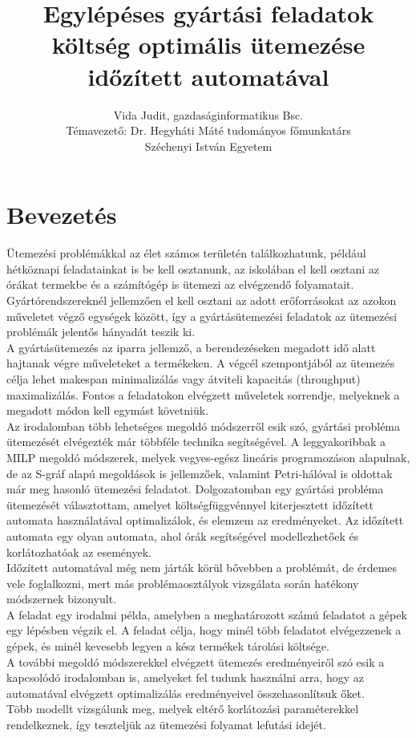 \documentclass {report}
\begin{document}
\title{Egylépéses gyártási feladatok költség optimális ütemezése időzített automatával}

\author{Vida Judit, gazdaságinformatikus Bsc.\\Témavezető: Dr. Hegyháti Máté tudományos főmunkatárs\\Széchenyi István Egyetem}
\maketitle


\tableofcontents
\chapter{Bevezetés}
Ütemezési problémákkal az élet számos területén találkozhatunk, például hétköznapi feladatainkat is be kell osztanunk, az iskolában el kell osztani az órákat termekbe és a számítógép is ütemezi az elvégzendő folyamatait. Gyártórendszereknél jellemzően el kell osztani az adott erőforrásokat az azokon műveletet végző egységek között, így a gyártásütemezési feladatok az ütemezési problémák jelentős hányadát teszik ki. \\
A gyártásütemezés az iparra jellemző, a berendezéseken megadott idő alatt hajtanak végre műveleteket a termékeken. A végcél szempontjából az ütemezés célja lehet makespan minimalizálás vagy átviteli kapacitás (throughput) maximalizálás. Fontos a feladatokon elvégzett műveletek sorrendje, melyeknek a megadott módon kell egymást követniük.\\
Az irodalomban több lehetséges megoldó módszerről esik szó, gyártási probléma ütemezését elvégezték már többféle technika segítségével. A leggyakoribbak a MILP megoldó módszerek, melyek vegyes-egész lineáris programozáson alapulnak, de az S-gráf alapú megoldások is jellemzőek, valamint Petri-hálóval is oldottak már meg hasonló ütemezési feladatot.
Dolgozatomban egy gyártási probléma ütemezését választottam, amelyet költségfüggvénnyel kiterjesztett időzített automata használatával optimalizálok, és elemzem az eredményeket. Az időzített automata egy olyan automata, ahol órák segítségével modellezhetőek és korlátozhatóak az események.\\
Időzített automatával még nem járták körül bővebben a problémát, de érdemes vele foglalkozni, mert más problémaosztályok vizsgálata során hatékony módszernek bizonyult.\\
A feladat egy irodalmi példa, amelyben a meghatározott számú feladatot a gépek egy lépésben végzik el.
A feladat célja, hogy minél több feladatot elvégezzenek a gépek, és minél kevesebb legyen a kész termékek tárolási költsége.\\
A további megoldó módszerekkel elvégzett ütemezés eredményeiről szó esik a kapcsolódó irodalomban is, amelyeket fel tudunk használni arra, hogy az automatával elvégzett optimalizálás eredményeivel összehasonlítsuk őket. \\
Több modellt vizsgálunk meg, melyek eltérő korlátozási paraméterekkel rendelkeznek, így teszteljük az ütemezési folyamat lefutási idejét.
\end{document}
